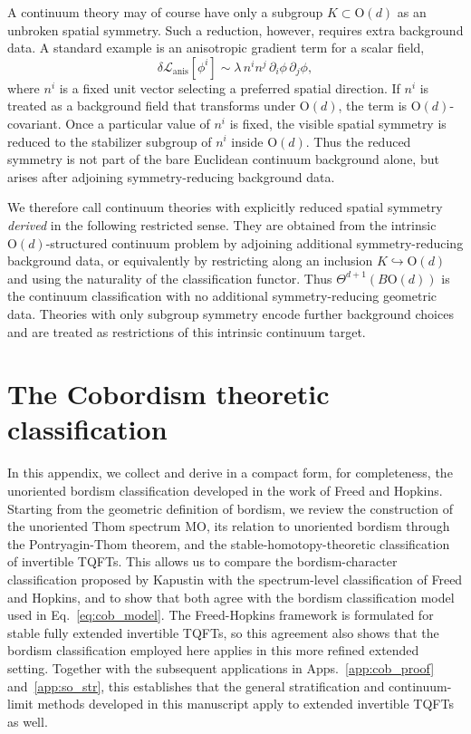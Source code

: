 \documentclass[aps,prx,reprint,superscriptaddress,twocolumn,amsmath,amssymb,amsfonts, nofootinbib]{revtex4-2}
\theoremstyle{apsstyle}
\begin{document}
\bigskip 

A continuum theory may of course have only a subgroup $K\subset \mathrm{O}(d)$ as an unbroken spatial symmetry. Such a reduction, however, requires extra background data. A standard example is an anisotropic gradient term for a scalar field,
\begin{equation}
    \delta\mathcal{L}_{\mathrm{anis}}[\phi^i]\sim \lambda\, n^{i}n^{j}\,\partial_{i}\phi\,\partial_{j}\phi ,
\end{equation}
where $n^{i}$ is a fixed unit vector selecting a preferred spatial direction. If $n^{i}$ is treated as a background field that transforms under $\mathrm{O}(d)$, the term is $\mathrm{O}(d)$-covariant. Once a particular value of $n^{i}$ is fixed, the visible spatial symmetry is reduced to the stabilizer subgroup of $n^{i}$ inside $\mathrm{O}(d)$. Thus the reduced symmetry is not part of the bare Euclidean continuum background alone, but arises after adjoining symmetry-reducing background data.

\medskip 

\noindent We therefore call continuum theories with explicitly reduced spatial symmetry \emph{derived} in the following restricted sense. They are obtained from the intrinsic $\mathrm{O}(d)$-structured continuum problem by adjoining additional symmetry-reducing background data, or equivalently by restricting along an inclusion $K\hookrightarrow \mathrm{O}(d)$ and using the naturality of the classification functor. Thus $\Theta^{d+1}(B\mathrm{O}(d))$ is the continuum classification with no additional symmetry-reducing geometric data. Theories with only subgroup symmetry encode further background choices and are treated as restrictions of this intrinsic continuum target.



\section{The Cobordism theoretic classification}
\label{app:cob}


In this appendix, we collect and derive in a compact form, for completeness, the unoriented bordism classification developed in the work of Freed and Hopkins. Starting from the geometric definition of bordism, we review the construction of the unoriented Thom spectrum $\mathrm{MO}$, its relation to unoriented bordism through the Pontryagin-Thom theorem, and the stable-homotopy-theoretic classification of invertible TQFTs. This allows us to compare the bordism-character classification proposed by Kapustin with the spectrum-level classification of Freed and Hopkins, and to show that both agree with the bordism classification model used in Eq.~\eqref{eq:cob_model}. The Freed-Hopkins framework is formulated for stable fully extended invertible TQFTs, so this agreement also shows that the bordism classification employed here applies in this more refined extended setting. Together with the subsequent applications in Apps.~\ref{app:cob_proof} and~\ref{app:so_str}, this establishes that the general stratification and continuum-limit methods developed in this manuscript apply to extended invertible TQFTs as well.
\end{document}
